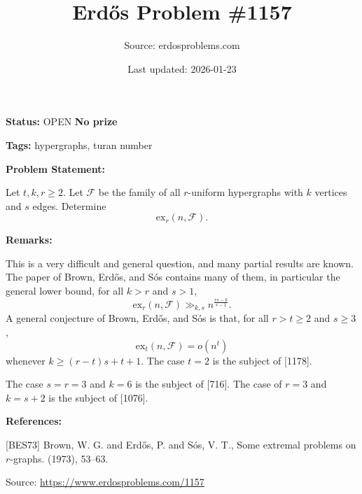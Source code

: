 \documentclass{article}
\title{Erd\H{o}s Problem \#1157}
\date{Last updated: 2026-01-23}
\author{Source: erdosproblems.com}
\begin{document}
\maketitle

\noindent\textbf{Status:} OPEN \quad \textbf{No prize}

\noindent\textbf{Tags:} hypergraphs, turan number

\medskip
\noindent\textbf{Problem Statement:}

Let $t,k,r\geq 2$. Let $\mathcal{F}$ be the family of all $r$-uniform hypergraphs with $k$ vertices and $s$ edges. Determine\[\mathrm{ex}_r(n,\mathcal{F}).\]

\bigskip
\noindent\textbf{Remarks:}

This is a very difficult and general question, and many partial results are known. The paper of Brown, Erd\H{o}s, and S\'{o}s \cite{BES73} contains many of them, in particular the general lower bound, for all $k>r$ and $s>1$,\[\mathrm{ex}_r(n,\mathcal{F})\gg_{k,s} n^{\frac{rs-k}{s-1}}.\]A general conjecture of Brown, Erd\H{o}s, and S\'{o}s is that, for all $r>t\geq 2$ and $s\geq 3$,\[\mathrm{ex}_t(n,\mathcal{F})=o(n^t)\]whenever $k\geq (r-t)s+t+1$. The case $t=2$ is the subject of [1178].

The case $s=r=3$ and $k=6$ is the subject of [716]. The case of $r=3$ and $k=s+2$ is the subject of [1076].

\bigskip
\noindent\textbf{References:}

[BES73] Brown, W. G. and Erd\H{o}s, P. and S\'os, V. T., Some extremal problems on {$r$}-graphs. (1973), 53--63.

\bigskip
\noindent\small{Source: \url{https://www.erdosproblems.com/1157}}
\end{document}
